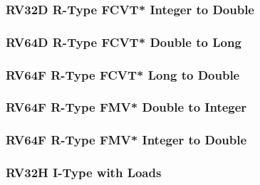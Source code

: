 

\subsubsection[{\small RV32D R-Type FCVT* Integer to Double}]{RV32D R-Type FCVT* Integer to Double} \label{sec:format-RV32D-RTypeFCI2D}



\subsubsection[{\small RV64D R-Type FCVT* Double to Long}]{RV64D R-Type FCVT* Double to Long} \label{sec:format-RV64D-RTypeFCD2L}



\subsubsection[{\small RV64F R-Type FCVT* Long to Double}]{RV64F R-Type FCVT* Long to Double} \label{sec:format-RV64D-RTypeFCL2D}



\subsubsection[{\small RV64F R-Type FMV* Double to Integer}]{RV64F R-Type FMV* Double to Integer} \label{sec:format-RV64D-RTypeFMF2I}



\subsubsection[{\small RV64F R-Type FMV* Integer to Double}]{RV64F R-Type FMV* Integer to Double} \label{sec:format-RV64D-RTypeFMI2F}



\subsubsection[{\small RV32H I-Type with Loads}]{RV32H I-Type with Loads} \label{sec:format-RV32H-ILoad}


